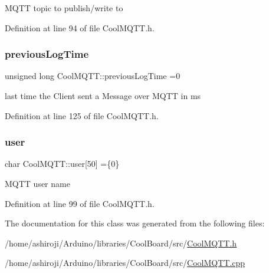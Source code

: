 M\+Q\+TT topic to publish/write to 

Definition at line 94 of file Cool\+M\+Q\+T\+T.\+h.

\mbox{\label{class_cool_m_q_t_t_a3db37ef9ed3b05b2a8d44edba0e7d3cc}} 
\subsubsection{\texorpdfstring{previous\+Log\+Time}{previousLogTime}}
{\footnotesize\ttfamily unsigned long Cool\+M\+Q\+T\+T\+::previous\+Log\+Time =0\hspace{0.3cm}{\ttfamily [private]}}

last time the Client sent a Message over M\+Q\+TT in ms 

Definition at line 125 of file Cool\+M\+Q\+T\+T.\+h.

\mbox{\label{class_cool_m_q_t_t_a8cd47e45d457f908d4b4390b35aaee83}} 
\subsubsection{\texorpdfstring{user}{user}}
{\footnotesize\ttfamily char Cool\+M\+Q\+T\+T\+::user\mbox{[}50\mbox{]} =\{\textquotesingle{}0\textquotesingle{}\}\hspace{0.3cm}{\ttfamily [private]}}

M\+Q\+TT user name 

Definition at line 99 of file Cool\+M\+Q\+T\+T.\+h.



The documentation for this class was generated from the following files\+:\begin{DoxyCompactItemize}
\item 
/home/ashiroji/\+Arduino/libraries/\+Cool\+Board/src/\hyperlink{_cool_m_q_t_t_8h}{Cool\+M\+Q\+T\+T.\+h}\item 
/home/ashiroji/\+Arduino/libraries/\+Cool\+Board/src/\hyperlink{_cool_m_q_t_t_8cpp}{Cool\+M\+Q\+T\+T.\+cpp}\end{DoxyCompactItemize}
